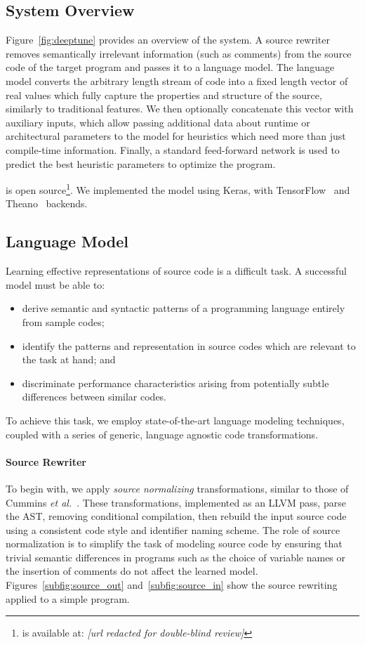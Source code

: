 \subsection{System Overview}

Figure~\ref{fig:deeptune} provides an overview of the system. A source rewriter removes semantically irrelevant
information (such as comments) from the source code of the target program and passes it to a language model. The language model converts the arbitrary length stream of code into a fixed length vector of real values which fully capture the properties and structure of the source, similarly to traditional features. We then optionally concatenate this vector with auxiliary inputs, which allow passing additional data about runtime or architectural parameters to the model for heuristics which need more than just compile-time information. Finally, a standard feed-forward network is used to predict the best heuristic parameters to optimize the program.

\DeepTune is open source\footnote{\DeepTune is available at: \emph{[url redacted for double-blind review]}}. We implemented the model using Keras, with TensorFlow~\cite{Abadi} and Theano~\cite{Bergstra2011} backends.


\subsection{Language Model}



Learning effective representations of source code is a difficult task. A successful model must be able to:
%
\begin{itemize}
\item derive semantic and syntactic patterns of a programming language entirely from sample codes;
\item identify the patterns and representation in source codes which are relevant to the task at hand; and
\item discriminate performance characteristics arising from potentially subtle differences between similar codes.
\end{itemize}
%
To achieve this task, we employ state-of-the-art language modeling techniques, coupled with a series of generic, language agnostic code transformations.

\paragraph{Source Rewriter} To begin with, we apply \emph{source normalizing} transformations, similar to those of Cummins \emph{et al.}~\cite{Cummins2017a}. These transformations, implemented as an LLVM pass, parse the AST, removing conditional compilation, then rebuild the input source code using a consistent code style and identifier naming scheme. The role of source normalization is to simplify the task of modeling source code by ensuring that trivial semantic differences in programs such as the choice of variable names or the insertion of comments do not affect the learned model. Figures~\ref{subfig:source_out} and~\ref{subfig:source_in} show the source rewriting applied to a simple program.

